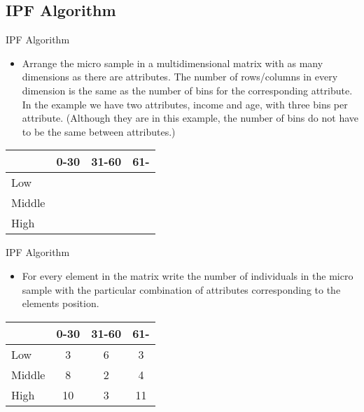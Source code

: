 \documentclass{beamer}
\begin{document}
\subsection{IPF Algorithm}
\begin{frame}{IPF Algorithm}
\begin{itemize}
  \item Arrange the micro sample in a multidimensional matrix with as many dimensions as there are attributes. 
The number of rows/columns in every dimension is the same as the number of bins for the corresponding attribute.
In the example we have two attributes, income and age, with three bins per attribute. (Although they are in this
example, the number of bins do not have to be the same between attributes.)
\end{itemize}

\begin{table}
\centering
\begin{tabular}{l||c c c}
 & 0-30 & 31-60 & 61-\\
\hline \hline
Low & & & \\
Middle & & & \\
High & & & \\
\end{tabular}
\end{table}
\end{frame}


\begin{frame}{IPF Algorithm}
\begin{itemize}
  \item For every element in the matrix write the number of individuals in the micro sample with the particular
combination of attributes corresponding to the elements position.
\end{itemize}

\begin{table}
\centering
\begin{tabular}{l||c c c}
 & 0-30 & 31-60 & 61- \\
\hline \hline
Low & 3 & 6 & 3 \\
Middle & 8 & 2 & 4 \\
High & 10 & 3 & 11 \\
\end{tabular}
\end{table}
\end{frame}
\end{document}
